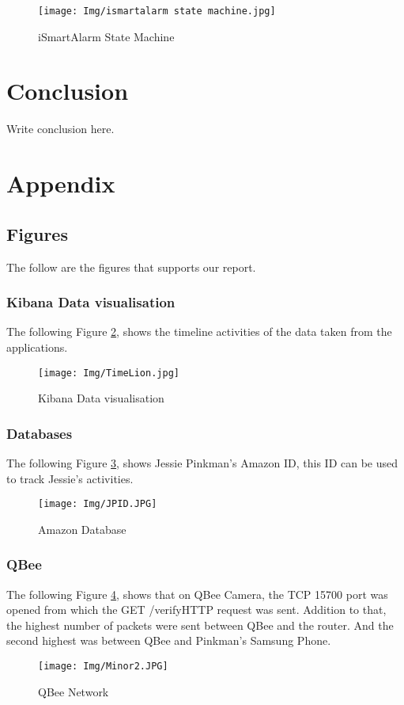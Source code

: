 \documentclass{easychair}
\begin{document}
\begin{figure}[H]
    \centering
    \texttt{[image: Img/ismartalarm state machine.jpg]}
    \caption{iSmartAlarm State Machine}
    \label{fig:iSmartAlarm State Machine}
\end{figure}



\section{Conclusion}
\label{sect:conclusion} Write conclusion here.


\newpage
\section{Appendix}

\subsection{Figures}
The follow are the figures that supports our report.
\subsubsection{Kibana Data visualisation}
The following Figure \ref{fig:Kibana Data visualisation}, shows the timeline activities of the data taken from the applications.
\begin{figure}[h]
    \centering
    \texttt{[image: Img/TimeLion.jpg]}
    \caption{Kibana Data visualisation}
    \label{fig:Kibana Data visualisation}
\end{figure}
\subsubsection{Databases}
The following Figure \ref{fig:Amazon Database}, shows Jessie Pinkman's Amazon ID, this ID can be used to track Jessie's activities.
\begin{figure}[h]
    \centering
    \texttt{[image: Img/JPID.JPG]}
    \caption{Amazon Database}
    \label{fig:Amazon Database}
\end{figure}
\newpage
\subsubsection{QBee}
The following Figure \ref{fig:QBee Network}, shows that on QBee Camera, the TCP 15700 port was opened from which the GET /verifyHTTP request was sent. Addition to that, the highest number of packets were sent between QBee and the router. And the second highest was between QBee and Pinkman’s Samsung Phone.
\begin{figure}[h]
    \centering
    \texttt{[image: Img/Minor2.JPG]}
    \caption{QBee Network}
    \label{fig:QBee Network}
\end{figure}
\newpage
\end{document}
